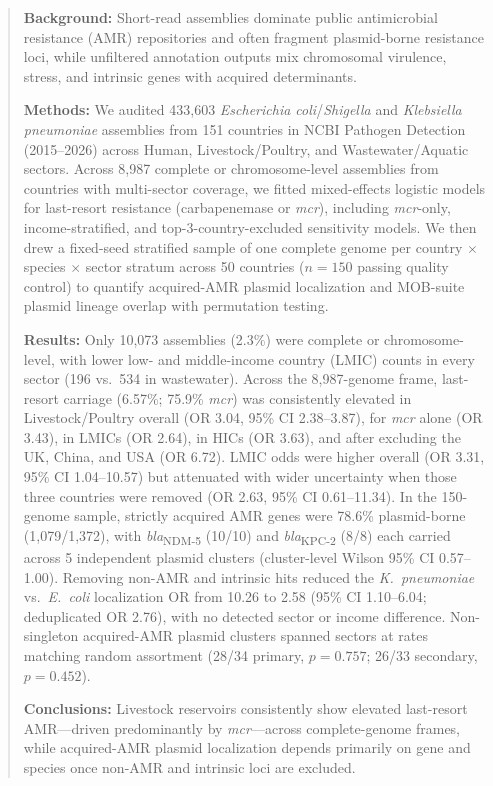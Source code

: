 \documentclass[11pt,a4paper]{article}
\begin{document}
\begin{abstract}
\noindent\textbf{Background:} Short-read assemblies dominate public antimicrobial resistance (AMR) repositories and often fragment plasmid-borne resistance loci, while unfiltered annotation outputs mix chromosomal virulence, stress, and intrinsic genes with acquired determinants.

\noindent\textbf{Methods:} We audited 433,603 \textit{Escherichia coli}/\textit{Shigella} and \textit{Klebsiella pneumoniae} assemblies from 151 countries in NCBI Pathogen Detection (2015--2026) across Human, Livestock/Poultry, and Wastewater/Aquatic sectors. Across 8,987 complete or chromosome-level assemblies from countries with multi-sector coverage, we fitted mixed-effects logistic models for last-resort resistance (carbapenemase or \textit{mcr}), including \textit{mcr}-only, income-stratified, and top-3-country-excluded sensitivity models. We then drew a fixed-seed stratified sample of one complete genome per country $\times$ species $\times$ sector stratum across 50 countries ($n = 150$ passing quality control) to quantify acquired-AMR plasmid localization and MOB-suite plasmid lineage overlap with permutation testing.

\noindent\textbf{Results:} Only 10,073 assemblies (2.3\%) were complete or chromosome-level, with lower low- and middle-income country (LMIC) counts in every sector (196 vs.\ 534 in wastewater). Across the 8,987-genome frame, last-resort carriage (6.57\%; 75.9\% \textit{mcr}) was consistently elevated in Livestock/Poultry overall (OR 3.04, 95\% CI 2.38--3.87), for \textit{mcr} alone (OR 3.43), in LMICs (OR 2.64), in HICs (OR 3.63), and after excluding the UK, China, and USA (OR 6.72). LMIC odds were higher overall (OR 3.31, 95\% CI 1.04--10.57) but attenuated with wider uncertainty when those three countries were removed (OR 2.63, 95\% CI 0.61--11.34). In the 150-genome sample, strictly acquired AMR genes were 78.6\% plasmid-borne (1,079/1,372), with \textit{bla}\textsubscript{NDM-5} (10/10) and \textit{bla}\textsubscript{KPC-2} (8/8) each carried across 5 independent plasmid clusters (cluster-level Wilson 95\% CI 0.57--1.00). Removing non-AMR and intrinsic hits reduced the \textit{K.~pneumoniae} vs.\ \textit{E.~coli} localization OR from 10.26 to 2.58 (95\% CI 1.10--6.04; deduplicated OR 2.76), with no detected sector or income difference. Non-singleton acquired-AMR plasmid clusters spanned sectors at rates matching random assortment (28/34 primary, $p = 0.757$; 26/33 secondary, $p = 0.452$).

\noindent\textbf{Conclusions:} Livestock reservoirs consistently show elevated last-resort AMR---driven predominantly by \textit{mcr}---across complete-genome frames, while acquired-AMR plasmid localization depends primarily on gene and species once non-AMR and intrinsic loci are excluded.
\end{abstract}
\end{document}
